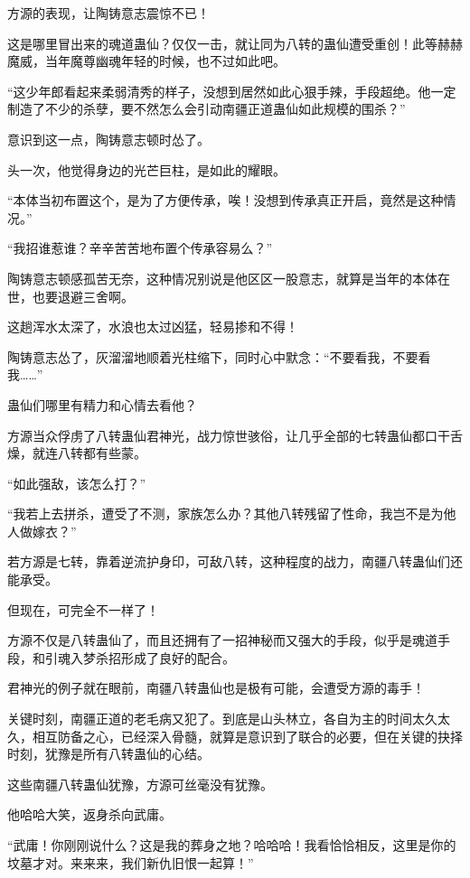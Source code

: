 
\begin{this_body}

方源的表现，让陶铸意志震惊不已！

这是哪里冒出来的魂道蛊仙？仅仅一击，就让同为八转的蛊仙遭受重创！此等赫赫魔威，当年魔尊幽魂年轻的时候，也不过如此吧。

“这少年郎看起来柔弱清秀的样子，没想到居然如此心狠手辣，手段超绝。他一定制造了不少的杀孽，要不然怎么会引动南疆正道蛊仙如此规模的围杀？”

意识到这一点，陶铸意志顿时怂了。

头一次，他觉得身边的光芒巨柱，是如此的耀眼。

“本体当初布置这个，是为了方便传承，唉！没想到传承真正开启，竟然是这种情况。”

“我招谁惹谁？辛辛苦苦地布置个传承容易么？”

陶铸意志顿感孤苦无奈，这种情况别说是他区区一股意志，就算是当年的本体在世，也要退避三舍啊。

这趟浑水太深了，水浪也太过凶猛，轻易掺和不得！

陶铸意志怂了，灰溜溜地顺着光柱缩下，同时心中默念：“不要看我，不要看我……”

蛊仙们哪里有精力和心情去看他？

方源当众俘虏了八转蛊仙君神光，战力惊世骇俗，让几乎全部的七转蛊仙都口干舌燥，就连八转都有些蒙。

“如此强敌，该怎么打？”

“我若上去拼杀，遭受了不测，家族怎么办？其他八转残留了性命，我岂不是为他人做嫁衣？”

若方源是七转，靠着逆流护身印，可敌八转，这种程度的战力，南疆八转蛊仙们还能承受。

但现在，可完全不一样了！

方源不仅是八转蛊仙了，而且还拥有了一招神秘而又强大的手段，似乎是魂道手段，和引魂入梦杀招形成了良好的配合。

君神光的例子就在眼前，南疆八转蛊仙也是极有可能，会遭受方源的毒手！

关键时刻，南疆正道的老毛病又犯了。到底是山头林立，各自为主的时间太久太久，相互防备之心，已经深入骨髓，就算是意识到了联合的必要，但在关键的抉择时刻，犹豫是所有八转蛊仙的心结。

这些南疆八转蛊仙犹豫，方源可丝毫没有犹豫。

他哈哈大笑，返身杀向武庸。

“武庸！你刚刚说什么？这是我的葬身之地？哈哈哈！我看恰恰相反，这里是你的坟墓才对。来来来，我们新仇旧恨一起算！”


\end{this_body}
